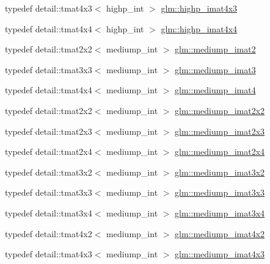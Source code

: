 \begin{DoxyCompactItemize}
\item 
typedef detail\+::tmat4x3$<$ highp\+\_\+int $>$ \hyperlink{group__gtc__matrix__integer_gaf644a447ba64f23d2245f0a3cac9cc74}{glm\+::highp\+\_\+imat4x3}
\item 
typedef detail\+::tmat4x4$<$ highp\+\_\+int $>$ \hyperlink{group__gtc__matrix__integer_gaff23c95b5feea2b2352b377810783823}{glm\+::highp\+\_\+imat4x4}
\item 
typedef detail\+::tmat2x2$<$ mediump\+\_\+int $>$ \hyperlink{group__gtc__matrix__integer_ga44c16e631d0b5ab68098131183c7e096}{glm\+::mediump\+\_\+imat2}
\item 
typedef detail\+::tmat3x3$<$ mediump\+\_\+int $>$ \hyperlink{group__gtc__matrix__integer_gacb4d126bfdbc9d292e7cdfe6f3e481e6}{glm\+::mediump\+\_\+imat3}
\item 
typedef detail\+::tmat4x4$<$ mediump\+\_\+int $>$ \hyperlink{group__gtc__matrix__integer_ga49908c8634fad44d78f09c3876c944db}{glm\+::mediump\+\_\+imat4}
\item 
typedef detail\+::tmat2x2$<$ mediump\+\_\+int $>$ \hyperlink{group__gtc__matrix__integer_gaf330f41983ed0d499d18277a44a54720}{glm\+::mediump\+\_\+imat2x2}
\item 
typedef detail\+::tmat2x3$<$ mediump\+\_\+int $>$ \hyperlink{group__gtc__matrix__integer_gaafb4b3293de5875ece1181709eddaa13}{glm\+::mediump\+\_\+imat2x3}
\item 
typedef detail\+::tmat2x4$<$ mediump\+\_\+int $>$ \hyperlink{group__gtc__matrix__integer_gaebbf06f493d6299238987c9715dc9064}{glm\+::mediump\+\_\+imat2x4}
\item 
typedef detail\+::tmat3x2$<$ mediump\+\_\+int $>$ \hyperlink{group__gtc__matrix__integer_ga91a2f7b0b7ab178581d8e10c56904f5d}{glm\+::mediump\+\_\+imat3x2}
\item 
typedef detail\+::tmat3x3$<$ mediump\+\_\+int $>$ \hyperlink{group__gtc__matrix__integer_ga648511f44df045d81db55770887b4354}{glm\+::mediump\+\_\+imat3x3}
\item 
typedef detail\+::tmat3x4$<$ mediump\+\_\+int $>$ \hyperlink{group__gtc__matrix__integer_ga2d58e291dd09052a80355106a5a36ea9}{glm\+::mediump\+\_\+imat3x4}
\item 
typedef detail\+::tmat4x2$<$ mediump\+\_\+int $>$ \hyperlink{group__gtc__matrix__integer_ga258c149bc7dc443db025b6a7c8a8492b}{glm\+::mediump\+\_\+imat4x2}
\item 
typedef detail\+::tmat4x3$<$ mediump\+\_\+int $>$ \hyperlink{group__gtc__matrix__integer_ga689c74a65fc4118f1fe57b6cf953748b}{glm\+::mediump\+\_\+imat4x3}
\item 

\end{DoxyCompactItemize}
